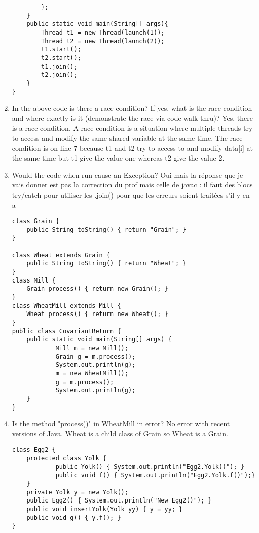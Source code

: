 \documentclass{article}
\begin{document}
\begin{enumerate}
\begin{lstlisting}
 		};
 	}
 	public static void main(String[] args){
  		Thread t1 = new Thread(launch(1));
  		Thread t2 = new Thread(launch(2));
  		t1.start();
  		t2.start();
  		t1.join();
  		t2.join();
 	}
}
\end{lstlisting}
	\item In the above code is there a race condition? If yes, what is the race condition and where exactly is it (demonstrate the race via code walk thru)?\newline
	Yes, there is a race condition. A race condition is a situation where multiple threads try to access and modify the same shared variable at the same time. The race condition is on line 7 because t1 and t2 try to access to and modify data[i] at the same time but t1 give the value one whereas t2 give the value 2.
	\item Would the code when run cause an Exception?\newline
	Oui mais la réponse que je vais donner est pas la correction du prof mais celle de javac : il faut des blocs try/catch pour utiliser les .join() pour que les erreurs soient traitées s'il y en a
\newpage
\begin{lstlisting}
class Grain {
  	public String toString() { return "Grain"; }
}

class Wheat extends Grain {
  	public String toString() { return "Wheat"; }
}
class Mill {
  	Grain process() { return new Grain(); }
}
class WheatMill extends Mill {
  	Wheat process() { return new Wheat(); }
}
public class CovariantReturn {
  	public static void main(String[] args) {
    		Mill m = new Mill();
    		Grain g = m.process();
    		System.out.println(g);
    		m = new WheatMill();
    		g = m.process();
    		System.out.println(g);
  	}
}
\end{lstlisting}
	\item Is the method "process()" in WheatMill in error?\newline
	No error with recent versions of Java. Wheat is a child class of Grain so Wheat is a Grain.
	\newpage
\begin{lstlisting}
class Egg2 {
  	protected class Yolk {   
    		public Yolk() { System.out.println("Egg2.Yolk()"); }       
    		public void f() { System.out.println("Egg2.Yolk.f()");}
  	}
  	private Yolk y = new Yolk();
  	public Egg2() { System.out.println("New Egg2()"); }
  	public void insertYolk(Yolk yy) { y = yy; }
  	public void g() { y.f(); }
} 


\end{lstlisting}
\end{enumerate}
\end{document}
